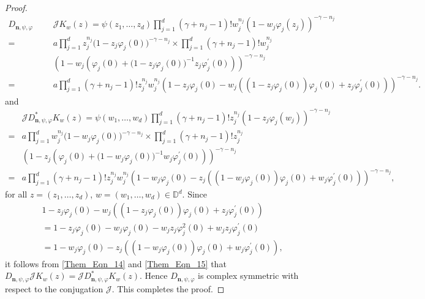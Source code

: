 \documentclass[10pt,a4paper]{amsart}
\newcommand{\mfn}{\mathbf n}
\begin{document}
\begin{proof}
  	   \begin{align}\label{Them_Eqn_14}
  	   D_{\mfn,\psi, \varphi}&\mathcal{J}K_w(z)
  	 = \psi(z_1, \dots, z_d)\prod_{j=1}^d(\gamma+n_j-1)!w_j^{n_j}(1-w_j\varphi_j(z_j))^{-\gamma-n_j}\nonumber\\
  	  =&a\prod_{j=1}^dz_j^{n_j}\big(1-z_j\varphi_j(0)\big)^{-\gamma-n_j}\times\prod_{j=1}^d(\gamma+n_j-1)!w_j^{n_j}\nonumber\\
  	 ~~~~~~~~~~~~~~~~~~~~&\left(1-w_j\left(\varphi_j(0)+\big(1-z_j\varphi_j(0)\big)^{-1}z_j\varphi_j^{\prime}(0)\right)\right)^{-\gamma-n_j}\nonumber\\
  	  =&a\prod_{j=1}^d(\gamma+n_j-1)!z_j^{n_j}w_j^{n_j}\left(1-z_j\varphi_j(0)-w_j\left((1-z_j\varphi_j(0))\varphi_j(0)+z_j\varphi_j^{\prime}(0)\right) \right)^{-\gamma-n_j}.
  	  \end{align} 
  	  and 
  	   \begin{align}\label{Them_Eqn_15}
  	  &  \mathcal{J}D_{\mfn,\psi, \varphi}^*K_w(z)
  	  = \psi(w_1, \dots, w_d)\prod_{j=1}^d(\gamma+n_j-1)!z_j^{n_j}(1-z_j\varphi_j(w_j))^{-\gamma-n_j}\nonumber\\
  	  =&a\prod_{j=1}^dw_j^{n_j}\big(1-w_j\varphi_j(0)\big)^{-\gamma-n_j}\times\prod_{j=1}^d(\gamma+n_j-1)!z_j^{n_j}\nonumber\\
  	  &\left(1-z_j\left(\varphi_j(0)+\big(1-w_j\varphi_j(0)\big)^{-1}w_j\varphi_j^{\prime}(0)\right)\right)^{-\gamma-n_j}\nonumber\\
  	  =&a\prod_{j=1}^d(\gamma+n_j-1)!z_j^{n_j}w_j^{n_j}\left(1-w_j\varphi_j(0)-z_j\left((1-w_j\varphi_j(0))\varphi_j(0)+w_j\varphi_j^{\prime}(0)\right) \right)^{-\gamma-n_j},
  	  \end{align} 
  	   for all $z=(z_1, \dots, z_d)$, $w=(w_1, \dots, w_d)\in \mathbb{D}^d$.
  	   Since 
  	   \begin{align}\label{Them_Eqn_16}
  	   &1-z_j\varphi_j(0)-w_j\left((1-z_j\varphi_j(0))\varphi_j(0)+z_j\varphi_j^{\prime}(0)\right)\nonumber\\
  	   &=1-z_j\varphi_j(0)-w_j\varphi_j(0)-w_jz_j\varphi_j^2(0)+w_jz_j\varphi_j^{\prime}(0)\nonumber\\
  	   &=1-w_j\varphi_j(0)-z_j\left((1-w_j\varphi_j(0))\varphi_j(0)+w_j\varphi_j^{\prime}(0)\right),
  	   \end{align}
  	   it follows from \eqref{Them_Eqn_14} and \eqref{Them_Eqn_15} that 
  	   $D_{\mfn,\psi, \varphi}\mathcal{J}K_w(z)=\mathcal{J}D_{\mfn,\psi, \varphi}^*K_w(z)$. Hence $D_{\mfn,\psi,\varphi}$ is complex symmetric with respect to the conjugation $\mathcal{J}$. This completes the proof.
\end{proof}
\end{document}
